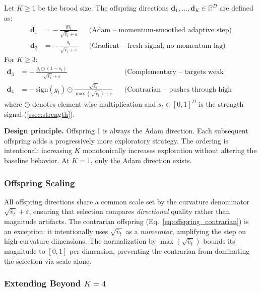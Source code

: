 \documentclass[12pt]{article}
\newcommand{\eqbox}[2]{%
  \begin{tcolorbox}[eqstyle, title={#1}]
    #2
  \end{tcolorbox}
}
\newcommand{\notebox}[1]{%
  \begin{tcolorbox}[notestyle]
    #1
  \end{tcolorbox}
}
\newcommand{\R}{\mathbb{R}}
\newcommand{\sign}{\mathrm{sign}}
\begin{document}
\eqbox{Definition 1 \textemdash\ Offspring Directions}{
Let $K \geq 1$ be the brood size.
The offspring directions
$\mathbf{d}_1, \ldots, \mathbf{d}_K \in \R^D$ are defined as:
\begin{align}
  \mathbf{d}_1 &= -\,\frac{\hat{m}_t}{\sqrt{\hat{v}_t} + \varepsilon}
  &&\text{(Adam -- momentum-smoothed adaptive step)}
  \label{eq:offspring_adam} \\[6pt]
  \mathbf{d}_2 &= -\,\frac{g_t}{\sqrt{\hat{v}_t} + \varepsilon}
  &&\text{(Gradient -- fresh signal, no momentum lag)}
  \label{eq:offspring_gradient}
\end{align}
For $K \geq 3$:
\begin{align}
  \mathbf{d}_3 &= -\,\frac{g_t \odot (1 - s_t)}
    {\sqrt{\hat{v}_t} + \varepsilon}
  &&\text{(Complementary -- targets weak dimensions)}
  \label{eq:offspring_complementary} \\[6pt]
  \mathbf{d}_4 &= -\,\sign(g_t) \odot
    \frac{\sqrt{\hat{v}_t}}{\max(\sqrt{\hat{v}_t}) + \varepsilon}
  &&\text{(Contrarian -- pushes through high curvature)}
  \label{eq:offspring_contrarian}
\end{align}
where $\odot$ denotes element-wise multiplication and
$s_t \in [0, 1]^D$ is the strength signal
(\cref{ssec:strength}).
}

\notebox{%
\textbf{Design principle.}
Offspring 1 is always the Adam direction.
Each subsequent offspring adds a progressively more exploratory strategy.
The ordering is intentional: increasing $K$ monotonically increases
exploration without altering the baseline behavior.
At $K = 1$, only the Adam direction exists.
}

\subsubsection{Offspring Scaling}

All offspring directions share a common scale set by the curvature
denominator $\sqrt{\hat{v}_t} + \varepsilon$, ensuring that selection
compares \emph{directional} quality rather than magnitude artifacts.
The contrarian offspring (Eq.~\ref{eq:offspring_contrarian}) is an
exception: it intentionally uses $\sqrt{\hat{v}_t}$ as a \emph{numerator},
amplifying the step on high-curvature dimensions.
The normalization by $\max(\sqrt{\hat{v}_t})$ bounds its magnitude
to $[0, 1]$ per dimension, preventing the contrarian from dominating
the selection via scale alone.

\subsubsection{Extending Beyond $K = 4$}
\end{document}
